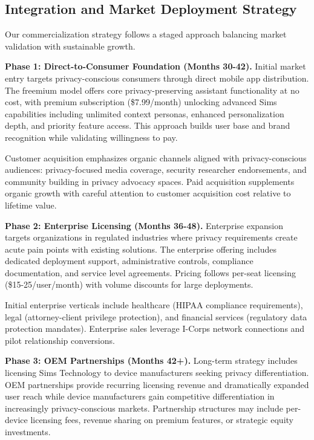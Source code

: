\documentclass[11pt]{article}
\begin{document}
\vspace*{-8pt}
\subsection{Integration and Market Deployment Strategy}
\vspace*{-8pt}
Our commercialization strategy follows a staged approach balancing market validation with sustainable growth.

\textbf{Phase 1: Direct-to-Consumer Foundation (Months 30-42).}
Initial market entry targets privacy-conscious consumers through direct mobile app distribution. The freemium model offers core privacy-preserving assistant functionality at no cost, with premium subscription (\$7.99/month) unlocking advanced Sims capabilities including unlimited context personas, enhanced personalization depth, and priority feature access. This approach builds user base and brand recognition while validating willingness to pay.

Customer acquisition emphasizes organic channels aligned with privacy-conscious audiences: privacy-focused media coverage, security researcher endorsements, and community building in privacy advocacy spaces. Paid acquisition supplements organic growth with careful attention to customer acquisition cost relative to lifetime value.

\textbf{Phase 2: Enterprise Licensing (Months 36-48).}
Enterprise expansion targets organizations in regulated industries where privacy requirements create acute pain points with existing solutions. The enterprise offering includes dedicated deployment support, administrative controls, compliance documentation, and service level agreements. Pricing follows per-seat licensing (\$15-25/user/month) with volume discounts for large deployments.

Initial enterprise verticals include healthcare (HIPAA compliance requirements), legal (attorney-client privilege protection), and financial services (regulatory data protection mandates). Enterprise sales leverage I-Corps network connections and pilot relationship conversions.

\textbf{Phase 3: OEM Partnerships (Months 42+).}
Long-term strategy includes licensing Sims Technology to device manufacturers seeking privacy differentiation. OEM partnerships provide recurring licensing revenue and dramatically expanded user reach while device manufacturers gain competitive differentiation in increasingly privacy-conscious markets. Partnership structures may include per-device licensing fees, revenue sharing on premium features, or strategic equity investments.
\end{document}
